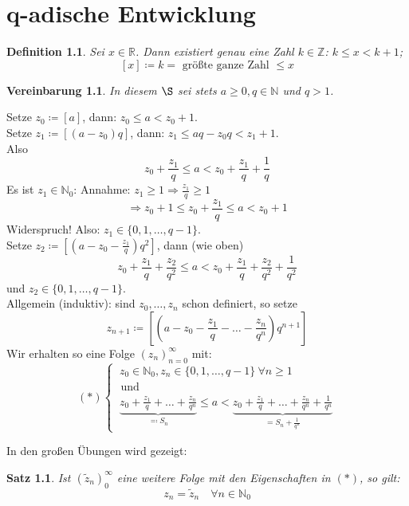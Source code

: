 \documentclass{extreport}
\newcommand{\N}{\mathbb{N}}
\newcommand{\R}{\mathbb{R}}
\newcommand{\Z}{\mathbb{Z}}
\theoremstyle{named}
\theoremstyle{dotless}
\newtheorem{satz}[namedtheorem]{Satz}
\newtheorem*{definition}{Definition}
\newtheorem*{vereinbarung}{Vereinbarung}
\begin{document}
\newpage


\chapter{q-adische Entwicklung}

\begin{definition}
	Sei $x \in \R$. Dann existiert genau eine Zahl $k \in \Z$: $k \leq x < k + 1$; 
		$$ [x] \coloneqq k = \text{ grö{\ss}te ganze Zahl } \leq x $$
\end{definition}


\begin{vereinbarung}
	In diesem $\S$ sei stets $a \geq 0, q \in \N$ und $q > 1$.
\end{vereinbarung}


Setze $z_{0} \coloneqq [a]$, dann: $z_{0} \leq a < z_{0} + 1$. \\
Setze $z_{1} \coloneqq [(a-z_{0})q]$, dann: $z_{1} \leq aq - z_{0}q < z_{1} + 1$. \\
Also
	$$ z_{0} + \frac{z_{1}}{q} \leq a < z_{0} + \frac{z_{1}}{q} + \frac{1}{q} $$
Es ist $z_{1} \in \N_{0}$: Annahme: $z_{1} \geq 1 \Rightarrow \frac{z_{1}}{q} \geq 1$
	$$ \Rightarrow z_{0} + 1 \leq z_{0} + \frac{z_{1}}{q} \leq a < z_{0} +1 $$
Widerspruch! Also: $z_{1} \in \{ 0, 1, \dotsc, q - 1 \}$. \\
Setze  $z_{2} \coloneqq [(a-z_{0}-\frac{z_{1}}{q})q^{2}]$, dann (wie oben)
	$$ z_{0} + \frac{z_{1}}{q} + \frac{z_{2}}{q^{2}} \leq a < z_{0} + \frac{z_{1}}{q} + \frac{z_{2}}{q^{2}} + \frac{1}{q^{2}} $$
und $z_{2} \in \{ 0, 1, \dotsc, q - 1 \}$. \\
Allgemein (induktiv): sind $z_{0}, \dotsc, z_{n}$ schon definiert, so setze
	$$ z_{n+1} \coloneqq [(a - z_{0} - \frac{z_{1}}{q} - \dotsc - \frac{z_{n}}{q^{n}}) q^{n+1}] $$
Wir erhalten so eine Folge $(z_{n})_{n=0}^{\infty}$ mit:
	$$ (*) \begin{cases} ~ z_{0} \in \N_{0}, z_{n} \in \{ 0, 1, \dotsc, q - 1 \} ~\forall n \geq 1 \\ \text{ und} \\ ~\underbrace{z_{0} + \frac{z_{1}}{q} + \dotsc + \frac{z_{n}}{q^{n}}}_{\eqqcolon S_{n}} \leq a < \underbrace{ z_{0} + \frac{z_{1}}{q} + \dotsc + \frac{z_{n}}{q^{n}} + \frac{1}{q^{n}}}_{= S_{n} + \frac{1}{q^{n}}} \end{cases} $$


In den gro{\ss}en Übungen wird gezeigt:

\begin{satz} \label{5.1:satz}
	Ist $(\tilde{z}_{n})_{0}^{\infty}$ eine weitere Folge mit den Eigenschaften in $(*)$, so gilt: 
	$$ z_{n} = \tilde{z}_{n} \quad \forall n \in \N_{0} $$
\end{satz}
\end{document}

